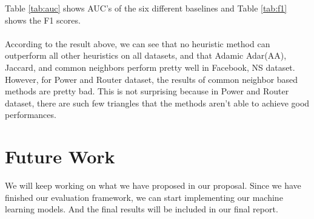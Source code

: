 \documentclass[12pt]{article}
\begin{document}
Table \ref{tab:auc} shows AUC's of the six different baselines and Table \ref{tab:f1} shows the F1 scores.
\\
\\
According to the result above, we can see that no heuristic method can outperform all other heuristics on all datasets, and that Adamic Adar(AA), Jaccard, and common neighbors perform pretty well in Facebook, NS dataset. However, for Power and Router dataset, the results of common neighbor based methods are pretty bad. This is not surprising because in Power and Router dataset, there are such few triangles that the methods aren't able to achieve good performances. 

\section{Future Work}
We will keep working on what we have proposed in our proposal. Since we have finished our evaluation framework, we can start implementing our machine learning models. And the final results will be included in our final report. 





\end{document}
